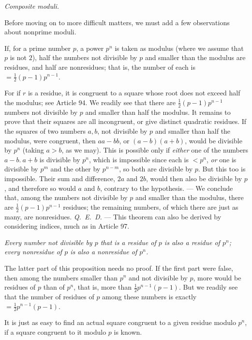 \begin{center}\small\emph{Composite moduli.}\end{center}

Before moving on to more difficult matters, we must add a few observations about nonprime moduli.

If, for a prime number $p$, a power $p^n$ is taken as modulus (where we assume that $p$ is not $2$), half the numbers not divisible by $p$ and smaller than the modulus are residues, and half are nonresidues; that is, the number of each is $=\tfrac12(p-1)p^{n-1}$.

For if $r$ is a residue, it is congruent to a square whose root does not exceed half the modulus; see Article 94. We readily see that there are $\tfrac12(p-1)p^{n-1}$ numbers not divisible by $p$ and smaller than half the modulus. It remains to prove that their squares are all incongruent, or give distinct quadratic residues. If the squares of two numbers $a,b$, not divisible by $p$ and smaller than half the modulus, were congruent, then $aa-bb$, or $(a-b)(a+b)$, would be divisible by $p^n$ (taking $a>b$, as we may). This is possible only if \emph{either} one of the numbers $a-b.\ a+b$ is divisible by $p^n$, which is impossible since each is $<p^n$, \emph{or} one is divisible by $p^m$ and the other by $p^{n-m}$, so both are divisible by $p$. But this too is impossible. Their sum and difference, $2a$ and $2b$, would then also be divisible by $p$, and therefore so would $a$ and $b$, contrary to the hypothesis. --- We conclude that, among the numbers not divisible by $p$ and smaller than the modulus, there are $\tfrac12(p-1)p^{n-1}$ residues; the remaining numbers, of which there are just as many, are nonresidues. \mbox{\emph{Q. E. D.}} --- This theorem can also be derived by considering indices, much as in Article 97.

\emph{Every number not divisible by $p$ that is a residue of $p$ is also a residue of $p^n$; every nonresidue of $p$ is also a nonresidue of $p^n$.}

The latter part of this proposition needs no proof. If the first part were false, then among the numbers smaller than $p^n$ and not divisible by $p$, more would be residues of $p$ than of $p^n$, that is, more than $\frac{1}{2}p^{n-1}(p-1)$. But we readily see that the number of residues of $p$ among these numbers is exactly $=\frac{1}{2}p^{n-1}(p-1)$.

It is just as easy to find an actual square congruent to a given residue modulo $p^n$, if a square congruent to it modulo $p$ is known.

